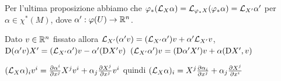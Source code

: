 Per l'ultima proposizione abbiamo che $\varphi_*(\mathcal L_X\alpha) = \mathcal L_{\varphi_*X}(\varphi_*\alpha) = \mathcal L_{X'}\alpha'$ per $\alpha\in\chi^*(M)$, dove $\alpha' : \varphi(U)\to\mathbb R^n$.

Dato $v\in\mathbb R^n$ fissato allora $\mathcal L_{X'}(\alpha'v) = (\mathcal L_{X'}\alpha')v + \alpha'\mathcal L_{X'}v$, $\mathrm D (\alpha'v)X' = (\mathcal L_{X'} \alpha') v - \alpha'(\mathrm D X'v)$
$(\mathcal L_{X'}\alpha') v = (\mathrm D \alpha'X') v + \alpha (\mathrm D X', v)$ %

$(\mathcal L_X\alpha)_iv^i = \frac{\partial \alpha^i}{\partial x^j}X^jv^i + \alpha_j\frac{\partial X^j}{\partial x^j}v^i$
quindi $(\mathcal L_X\alpha)_i = X^j\frac{\partial \alpha_i}{\partial x^j} + \alpha_j\frac{\partial X^j}{\partial x^i}$



































































